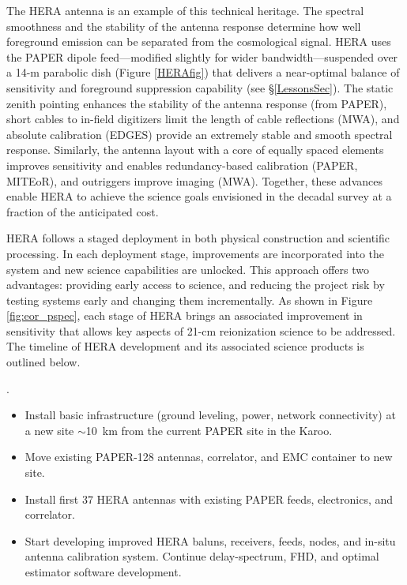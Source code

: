 \documentclass[preprint]{aastex}
\begin{document}

The HERA antenna is an example of this technical heritage. The spectral
smoothness and the stability of the antenna response determine how well
foreground emission can be separated from the cosmological signal.
HERA uses the PAPER dipole feed---modified slightly for wider
bandwidth---suspended over a 14-m parabolic dish (Figure \ref{HERAfig}) that
delivers a near-optimal balance of sensitivity and foreground suppression capability (see \S\ref{LessonsSec}).
The static zenith pointing enhances the stability of the antenna response
(from PAPER), short cables to in-field digitizers limit the length of cable
reflections (MWA), and absolute calibration (EDGES) provide
an extremely stable and smooth spectral response. Similarly, the antenna layout
with a core of equally spaced elements improves sensitivity
and enables redundancy-based calibration (PAPER, MITEoR), and 
outriggers improve imaging (MWA).
Together,
these advances enable HERA to achieve the science goals envisioned in the decadal
survey at a fraction of the anticipated cost. 

HERA follows a staged deployment in both physical construction and scientific processing.  In
each deployment stage, improvements are incorporated into the system and new
science capabilities are unlocked.  
This approach offers two advantages: 
providing early access to science, and reducing the project risk by testing systems
early and changing them incrementally.  As shown in Figure \ref{fig:eor_pspec}, each
stage of HERA brings an associated improvement in sensitivity that allows key
aspects of 21-cm reionization science to be addressed.  
The timeline of HERA 
development and its associated science products is outlined below. 

.  
\begin{itemize}\setlength{\parskip}{0pt}\itemsep0pt
\vspace{-7pt}
  \item Install basic infrastructure (ground leveling, power, network connectivity) at a new site $\sim$10~km from 
the current PAPER site in the Karoo.
  \item Move existing PAPER-128 antennas, correlator, and EMC container to new site.
  \item Install first 37 HERA antennas with existing PAPER feeds, electronics, and correlator. 
  \item Start developing improved HERA baluns, receivers, feeds, 
nodes, and in-situ antenna calibration system.
Continue delay-spectrum, FHD, 
and optimal estimator software development.
\end{itemize}
\end{document}
